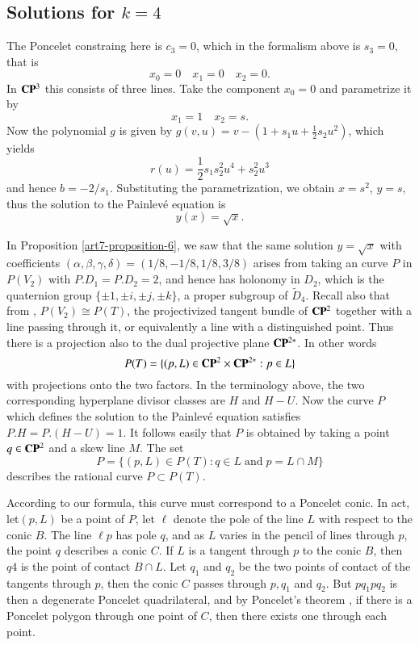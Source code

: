 \subsection{Solutions for $k=4$}\label{art7-subsec-6.2}

The Poncelet constraing here is $c_{3}=0$, which in the formalism above is $s_{3}=0$, that is
$$
x_{0}=0 \quad x_{1}=0 \quad x_{2}=0.
$$
In $\mathbf{C}\mathbf{P}^{3}$ this consists of three lines. Take the component $x_{0}=0$ and parametrize it by
$$
x_{1}=1 \quad x_{2}=s.
$$
Now the polynomial $g$ is given by $g(v,u)=v-(1+s_{1}u+\frac{1}{2}s_{2}u^{2})$, which yields
$$
r(u) = \dfrac{1}{2}s_{1}s_{2}^{2}u^{4} +s_{2}^{2}u^{3}
$$
and hence $b=-2/s_{1}$. Substituting the parametrization, we obtain $x=s^{2}$, $y=s$, thus the solution to the
 Painlev\'e equation is
$$
y(x) = \sqrt{x}.
$$

\begin{remark*}
In Proposition \ref{art7-proposition-6}, we saw that the same solution $y=\sqrt{x}$ with coefficients $(\alpha, \beta,\gamma, \delta)=(1/8, -1/8, 1/8, 3/8)$ arises from taking an curve $P$ in $P(V_{2})$ with $P.D_{1} =P.D_{2}=2$, and hence has holonomy in $D_{2}$, which is the quaternion group $\{\pm 1, \pm i, \pm j, \pm k\}$, a proper subgroup of $\tilde{D}_{4}$. Recall also that from \cite{art7-key16}, $P(V_{2}) \cong P(T)$, the projectivized tangent bundle of $\mathbf{C}\mathbf{P}^{2}$ together with a line passing through it, or equivalently a line with a distinguished point. Thus there is a projection also to the dual projective plane $\mathbf{C}\mathbf{P}^{2*}$. In other words
$$
P(T)=\{(p, L) \in \mathbf{C}\mathbf{P}^{2} \times \mathbf{C}\mathbf{P}^{2*} : p \in L\}
$$
with projections onto the two factors. In the terminology above, the two corresponding hyperplane divisor classes are $H$ and $H-U$. Now the curve $P$ which defines the solution to the Painlev\'e equation satisfies $P.H =P.(H-U)=1$. It follows easily that $P$ is obtained by taking a point $q\in \mathbf{C}\mathbf{P}^{2}$ and a skew line $M$.  The set
$$
P=\{(p, L) \in P(T) :q \in L \; \text{and} \; p = L\cap M\}
$$
describes the rational curve $P\subset P(T)$.

According to our formula, this curve must correspond to a Poncelet conic. In act, let$(p, L)$ be a point of $P$, let $\ell$ denote the pole of the line $L$ with respect to the conic $B$. The line $\ell p$ has pole $q$, and as $L$ varies in the pencil of lines through $p$, the point $q$ describes a conic $C$. If $L$ is a tangent through $p$ to the conic $B$, then $q4$ is the point of contact $B \cap L$. Let $q_{1}$ and $q_{2}$ be the two points of contact of the tangents through $p$, then the conic $C$ passes through $p, q_{1}$ and $q_{2}$. But $pq_{1}pq_{2}$ is then a degenerate Poncelet quadrilateral, and by Poncelet's theorem \cite{art7-key3}, if there is a Poncelet polygon through one point of $C$, then there exists one through each point.
\end{remark*}

